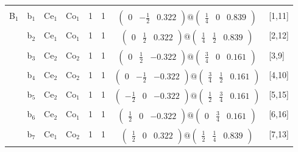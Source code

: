 \documentclass[fleqn,10pt,landscape]{article}
\begin{document}
\begin{itemize}
\begin{center}
\begin{longtable}{cc|cc|c|c|c|l}
 \hline \hline
\multicolumn{7}{r}{} \\ \endlastfoot

B$_{1}$ & b$_{1}$ & Ce$_{1}$ & Co$_{1}$ & 1 & 1 & $\begin{pmatrix} 0 & - \frac{1}{2} & 0.322 \end{pmatrix}@\begin{pmatrix} \frac{1}{4} & 0 & 0.839 \end{pmatrix}$ & [1,11] \\
& b$_{2}$ & Ce$_{1}$ & Co$_{1}$ & 1 & 1 & $\begin{pmatrix} 0 & \frac{1}{2} & 0.322 \end{pmatrix}@\begin{pmatrix} \frac{1}{4} & \frac{1}{2} & 0.839 \end{pmatrix}$ & [2,12] \\
& b$_{3}$ & Ce$_{2}$ & Co$_{2}$ & 1 & 1 & $\begin{pmatrix} 0 & \frac{1}{2} & -0.322 \end{pmatrix}@\begin{pmatrix} \frac{3}{4} & 0 & 0.161 \end{pmatrix}$ & [3,9] \\
& b$_{4}$ & Ce$_{2}$ & Co$_{2}$ & 1 & 1 & $\begin{pmatrix} 0 & - \frac{1}{2} & -0.322 \end{pmatrix}@\begin{pmatrix} \frac{3}{4} & \frac{1}{2} & 0.161 \end{pmatrix}$ & [4,10] \\
& b$_{5}$ & Ce$_{2}$ & Co$_{1}$ & 1 & 1 & $\begin{pmatrix} - \frac{1}{2} & 0 & -0.322 \end{pmatrix}@\begin{pmatrix} \frac{1}{2} & \frac{3}{4} & 0.161 \end{pmatrix}$ & [5,15] \\
& b$_{6}$ & Ce$_{2}$ & Co$_{1}$ & 1 & 1 & $\begin{pmatrix} \frac{1}{2} & 0 & -0.322 \end{pmatrix}@\begin{pmatrix} 0 & \frac{3}{4} & 0.161 \end{pmatrix}$ & [6,16] \\
& b$_{7}$ & Ce$_{1}$ & Co$_{2}$ & 1 & 1 & $\begin{pmatrix} \frac{1}{2} & 0 & 0.322 \end{pmatrix}@\begin{pmatrix} \frac{1}{2} & \frac{1}{4} & 0.839 \end{pmatrix}$ & [7,13] \\

\end{longtable}
\end{center}
\end{itemize}
\end{document}
